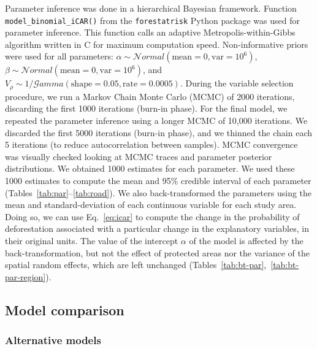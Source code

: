 \documentclass[
  12pt,
]{article}
\begin{document}
Parameter inference was done in a hierarchical Bayesian framework. Function \texttt{model\_binomial\_iCAR()} from the \texttt{forestatrisk} Python package \citep{Vieilledent2021a} was used for parameter inference. This function calls an adaptive Metropolis-within-Gibbs algorithm written in C for maximum computation speed. Non-informative priors were used for all parameters: \(\alpha \sim \mathcal{N}ormal(\text{mean}=0,\text{var}=10^6)\), \(\beta \sim \mathcal{N}ormal(\text{mean}=0,\text{var}=10^6)\), and \(V_{\rho} \sim 1/\mathcal{G}amma(\text{shape}=0.05,\text{rate}=0.0005)\). During the variable selection procedure, we run a Markov Chain Monte Carlo (MCMC) of 2000 iterations, discarding the first 1000 iterations (burn-in phase). For the final model, we repeated the parameter inference using a longer MCMC of 10,000 iterations. We discarded the first 5000 iterations (burn-in phase), and we thinned the chain each 5 iterations (to reduce autocorrelation between samples). MCMC convergence was visually checked looking at MCMC traces and parameter posterior distributions. We obtained 1000 estimates for each parameter. We used these 1000 estimates to compute the mean and 95\% credible interval of each parameter (Tables~\ref{tab:par}--\ref{tab:road}). We also back-transformed the parameters using the mean and standard-deviation of each continuous variable for each study area. Doing so, we can use Eq.~\eqref{eq:icar} to compute the change in the probability of deforestation associated with a particular change in the explanatory variables, in their original units. The value of the intercept \(\alpha\) of the model is affected by the back-transformation, but not the effect of protected areas nor the variance of the spatial random effects, which are left unchanged (Tables~\ref{tab:bt-par},~\ref{tab:bt-par-region}).

\hypertarget{model-comparison}{%
\subsection{Model comparison}\label{model-comparison}}

\hypertarget{alternative-models}{%
\subsubsection{Alternative models}\label{alternative-models}}
\end{document}
